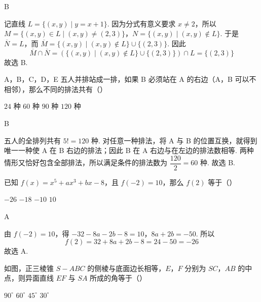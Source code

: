 \documentclass[UTF8,a4paper,oneside,11pt]{ctexbook}
\begin{document}
\begin{answer}B\end{answer}

\begin{solution}
记直线 \(L=\{(x,y)\mid y=x+1\}\). 因为分式有意义要求 \(x\ne2\)，所以
\(M=\{(x,y)\in L\mid (x,y)\ne(2,3)\}\)，\(N=\{(x,y)\mid (x,y)\notin L\}\).
于是 \(\overline{N}=L\)，而 \(\overline{M}=\{(x,y)\mid (x,y)\notin L\}\cup\{(2,3)\}\). 因此
\[
\overline{M}\cap\overline{N}=\left(\{(x,y)\mid (x,y)\notin L\}\cup\{(2,3)\}\right)\cap L=\{(2,3)\}
\]
故选 B.
\end{solution}


\begin{problem}
A，B，C，D，E 五人并排站成一排，如果 B 必须站在 A 的右边（A，B 可以不相邻），那么不同的排法共有（\quad）

\choices
    {\(24\) 种}
    {\(60\) 种}
    {\(90\) 种}
    {\(120\) 种}
\end{problem}

\begin{answer}B\end{answer}

\begin{solution}
五人的全排列共有 \(5!=120\) 种. 对任意一种排法，将 A 与 B 的位置互换，就得到唯一一种使 A 在 B 右边的排法；因此 B 在 A 右边与在左边的排法数相等. 两种情形又恰好包含全部排法，所以满足条件的排法数为 \(\dfrac{120}{2}=60\) 种. 故选 B.
\end{solution}


\begin{problem}
已知 \(f(x)=x^5+ax^3+bx-8\)，且 \(f(-2)=10\)，那么 \(f(2)\) 等于（\quad）

\choices
    {\(-26\)}
    {\(-18\)}
    {\(-10\)}
    {\(10\)}
\end{problem}

\begin{answer}A\end{answer}

\begin{solution}
由 \(f(-2)=10\)，得
\(-32-8a-2b-8=10\)，\(8a+2b=-50\).
所以
\[
f(2)=32+8a+2b-8=24-50=-26
\]
故选 A.
\end{solution}


\begin{problem}
如图，正三棱锥 \(S-ABC\) 的侧棱与底面边长相等，\(E\)，\(F\) 分别为 \(SC\)，\(AB\) 的中点，则异面直线 \(EF\) 与 \(SA\) 所成的角等于（\quad）


\choices
    {\(90^\circ\)}
    {\(60^\circ\)}
    {\(45^\circ\)}
    {\(30^\circ\)}
\end{problem}
\end{document}
